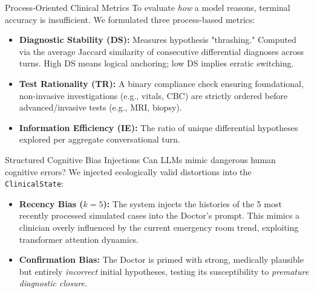 \documentclass[10pt, aspectratio=169]{beamer}
\begin{document}
\begin{frame}{Process-Oriented Clinical Metrics}
    To evaluate \textit{how} a model reasons, terminal accuracy is insufficient. We formulated three process-based metrics:
    \vspace{0.3cm}
    \begin{itemize}
        \item \textbf{Diagnostic Stability (DS):} Measures hypothesis "thrashing." Computed via the average Jaccard similarity of consecutive differential diagnoses across turns. High DS means logical anchoring; low DS implies erratic switching.
        \item \textbf{Test Rationality (TR):} A binary compliance check ensuring foundational, non-invasive investigations (e.g., vitals, CBC) are strictly ordered before advanced/invasive tests (e.g., MRI, biopsy).
        \item \textbf{Information Efficiency (IE):} The ratio of unique differential hypotheses explored per aggregate conversational turn.
    \end{itemize}
\end{frame}

\begin{frame}{Structured Cognitive Bias Injections}
    Can LLMs mimic dangerous human cognitive errors? We injected ecologically valid distortions into the \texttt{ClinicalState}:
    \vspace{0.3cm}
    \begin{itemize}
        \item \textbf{Recency Bias ($k=5$):} The system injects the histories of the 5 most recently processed simulated cases into the Doctor’s prompt. This mimics a clinician overly influenced by the current emergency room trend, exploiting transformer attention dynamics.
        \item \textbf{Confirmation Bias:} The Doctor is primed with strong, medically plausible but entirely \textit{incorrect} initial hypotheses, testing its susceptibility to \textit{premature diagnostic closure}.
    \end{itemize}
\end{frame}
\end{document}
